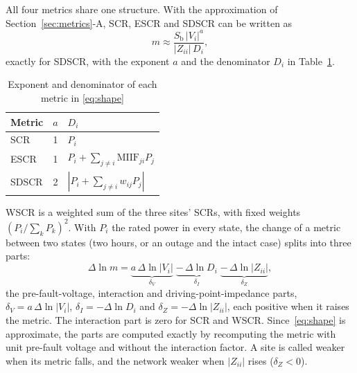 All four metrics share one structure. With the approximation of Section~\ref{sec:metrics}-A,
SCR, ESCR and SDSCR can be written as
\begin{equation}
m \approx \frac{S_\mathrm{b}\,|V_i|^{a}}{|Z_{ii}|\,D_i} ,
\label{eq:shape}
\end{equation}
exactly for SDSCR, with the exponent $a$ and the denominator $D_i$ in Table~\ref{tab:shape}.
\begin{table}[!t]
\caption{Exponent and denominator of each metric in \eqref{eq:shape}}
\label{tab:shape}
\centering
\footnotesize
\renewcommand{\arraystretch}{1.3}
\begin{tabular}{@{}lcl@{}}
\toprule
Metric & $a$ & $D_i$ \\
\midrule
SCR & 1 & $P_i$ \\
ESCR & 1 & $P_i + \sum_{j\ne i}\mathrm{MIIF}_{ji}P_j$ \\
SDSCR & 2 & $|P_i + \sum_{j\ne i} w_{ij}P_j|$ \\
\bottomrule
\end{tabular}
\end{table}
WSCR is a weighted sum of the three sites' SCRs, with fixed weights $(P_i/\sum_k P_k)^2$. With $P_i$ the rated power in every state, the
change of a metric between two states (two hours, or an outage and the intact case) splits into
three parts:
\begin{equation}
\Delta\ln m = \underbrace{a\,\Delta\ln|V_i|}_{\delta_V}
\;\underbrace{-\,\Delta\ln D_i}_{\delta_I}
\;\underbrace{-\,\Delta\ln|Z_{ii}|}_{\delta_Z} ,
\label{eq:split}
\end{equation}
the pre-fault-voltage, interaction and driving-point-impedance parts,
$\delta_V = a\,\Delta\ln|V_i|$, $\delta_I = -\Delta\ln D_i$ and $\delta_Z = -\Delta\ln|Z_{ii}|$,
each positive when it raises the metric. The interaction part is zero
for SCR and WSCR. Since~\eqref{eq:shape} is approximate, the parts are computed exactly by recomputing the metric
with unit pre-fault voltage and without the interaction factor. A site is called weaker when its
metric falls, and the network weaker when $|Z_{ii}|$ rises ($\delta_Z < 0$).
